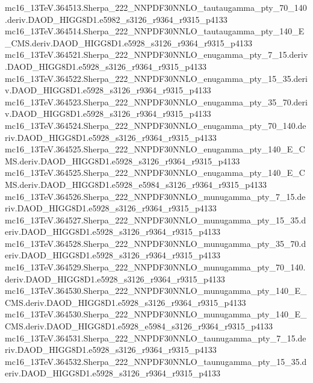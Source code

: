 \begin{scriptsize}
mc16\_13TeV.364513.Sherpa\_222\_NNPDF30NNLO\_tautaugamma\_pty\_70\_140.deriv.DAOD\_HIGG8D1.e5982\_s3126\_r9364\_r9315\_p4133 \\
mc16\_13TeV.364514.Sherpa\_222\_NNPDF30NNLO\_tautaugamma\_pty\_140\_E\_CMS.deriv.DAOD\_HIGG8D1.e5928\_s3126\_r9364\_r9315\_p4133 \\
mc16\_13TeV.364521.Sherpa\_222\_NNPDF30NNLO\_enugamma\_pty\_7\_15.deriv.DAOD\_HIGG8D1.e5928\_s3126\_r9364\_r9315\_p4133 \\
mc16\_13TeV.364522.Sherpa\_222\_NNPDF30NNLO\_enugamma\_pty\_15\_35.deriv.DAOD\_HIGG8D1.e5928\_s3126\_r9364\_r9315\_p4133 \\
mc16\_13TeV.364523.Sherpa\_222\_NNPDF30NNLO\_enugamma\_pty\_35\_70.deriv.DAOD\_HIGG8D1.e5928\_s3126\_r9364\_r9315\_p4133 \\
mc16\_13TeV.364524.Sherpa\_222\_NNPDF30NNLO\_enugamma\_pty\_70\_140.deriv.DAOD\_HIGG8D1.e5928\_s3126\_r9364\_r9315\_p4133 \\
mc16\_13TeV.364525.Sherpa\_222\_NNPDF30NNLO\_enugamma\_pty\_140\_E\_CMS.deriv.DAOD\_HIGG8D1.e5928\_s3126\_r9364\_r9315\_p4133 \\
mc16\_13TeV.364525.Sherpa\_222\_NNPDF30NNLO\_enugamma\_pty\_140\_E\_CMS.deriv.DAOD\_HIGG8D1.e5928\_e5984\_s3126\_r9364\_r9315\_p4133 \\
mc16\_13TeV.364526.Sherpa\_222\_NNPDF30NNLO\_munugamma\_pty\_7\_15.deriv.DAOD\_HIGG8D1.e5928\_s3126\_r9364\_r9315\_p4133 \\
mc16\_13TeV.364527.Sherpa\_222\_NNPDF30NNLO\_munugamma\_pty\_15\_35.deriv.DAOD\_HIGG8D1.e5928\_s3126\_r9364\_r9315\_p4133 \\
mc16\_13TeV.364528.Sherpa\_222\_NNPDF30NNLO\_munugamma\_pty\_35\_70.deriv.DAOD\_HIGG8D1.e5928\_s3126\_r9364\_r9315\_p4133 \\
mc16\_13TeV.364529.Sherpa\_222\_NNPDF30NNLO\_munugamma\_pty\_70\_140.deriv.DAOD\_HIGG8D1.e5928\_s3126\_r9364\_r9315\_p4133 \\
mc16\_13TeV.364530.Sherpa\_222\_NNPDF30NNLO\_munugamma\_pty\_140\_E\_CMS.deriv.DAOD\_HIGG8D1.e5928\_s3126\_r9364\_r9315\_p4133 \\
mc16\_13TeV.364530.Sherpa\_222\_NNPDF30NNLO\_munugamma\_pty\_140\_E\_CMS.deriv.DAOD\_HIGG8D1.e5928\_e5984\_s3126\_r9364\_r9315\_p4133 \\
mc16\_13TeV.364531.Sherpa\_222\_NNPDF30NNLO\_taunugamma\_pty\_7\_15.deriv.DAOD\_HIGG8D1.e5928\_s3126\_r9364\_r9315\_p4133 \\
mc16\_13TeV.364532.Sherpa\_222\_NNPDF30NNLO\_taunugamma\_pty\_15\_35.deriv.DAOD\_HIGG8D1.e5928\_s3126\_r9364\_r9315\_p4133 \\

\end{scriptsize}
